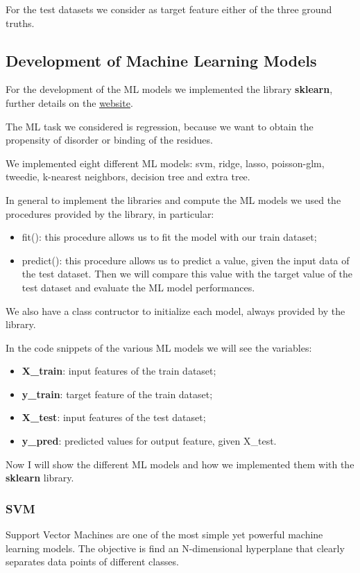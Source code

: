 For the test datasets we consider as target feature either of the three ground truths.

\subsection{Development of Machine Learning Models}
For the development of the ML models we implemented the library \textbf{sklearn}, further details on the \href{https://scikit-learn.org/stable/}{\underline{website}}.

The ML task we considered is regression, because we want to obtain the propensity of disorder or binding of the residues.

We implemented eight different ML models: svm, ridge, lasso, poisson-glm, tweedie, k-nearest neighbors, decision tree and extra tree. 

In general to implement the libraries and compute the ML models we used the procedures provided by the library, in particular:
\begin{itemize}
    \item fit(): this procedure allows us to fit the model with our train dataset;
    \item predict(): this procedure allows us to predict a value, given the input data of the test dataset. Then we will compare this value with the target value of the test dataset and evaluate the ML model performances.
\end{itemize}
We also have a class contructor to initialize each model, always provided by the library.

In the code snippets of the various ML models we will see the variables:
\begin{itemize}
    \item \textbf{X\_train}: input features of the train dataset;
    \item \textbf{y\_train}: target feature of the train dataset;
    \item \textbf{X\_test}: input features of the test dataset;
    \item \textbf{y\_pred}: predicted values for output feature, given X\_test.
\end{itemize}

Now I will show the different ML models and how we implemented them with the \textbf{sklearn} library.

\subsubsection{SVM}
Support Vector Machines are one of the most simple yet powerful machine learning models. The objective is find an N-dimensional hyperplane that clearly separates data points of different classes.

